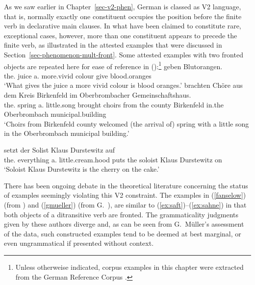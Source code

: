 As we saw earlier in Chapter~\ref{sec-v2-phen}, German is classed as V2 language, that is, normally
exactly one constituent occupies the position before the finite verb in declarative main clauses. In
what have been claimed to constitute rare, exceptional cases, however, more than one constituent
appears to precede the finite verb, as illustrated in the attested examples that were discussed in
Section~\ref{sec-phenomenon-mult-front}. Some attested examples with two fronted objects are
repeated here for ease of reference in ():\footnote{Unless otherweise indicated, corpus examples in this
  chapter were extracted from the German Reference Corpus \citep{DeReKo}.} 
\eal
\ex\label{ex:saft}
     geben Blutorangen.\footnotemark\\
         \hspaceThis{[}the.\dat{} juice \hspaceThis{[}a.\acc{} more.vivid colour give blood.oranges\\
    \glt `What gives the juice a more vivid colour is blood oranges.'
\ex
{} brachten Chöre aus dem Kreis Birkenfeld im Oberbrombacher Gemeinschaftshaus.\footnotemark\\
\hspaceThis{[}the.\dat{} spring \hspaceThis{[}a.\acc{} little.song brought choirs from the county Birkenfeld
    in.the Oberbrombach municipal.building\\
\glt `Choirs from Birkenfeld county welcomed (the arrival of) spring with a little song in the Oberbrombach municipal building.'\label{fruehling-zwei}

\ex
{} setzt der Solist Klaus Durstewitz auf\footnotemark\\
     \hspaceThis{[}the.\dat{} everything \hspaceThis{[}a.\acc{} little.cream.hood puts the soloist Klaus
         Durstewitz on\\
\glt `Soloist Klaus Durstewitz is the cherry on the cake.'\label{ex:sahne}
\zl

There has been ongoing debate in the theoretical literature concerning the status of examples seemingly violating this V2 constraint. The examples in (\ref{fanselow}) (from \citealp{Fanselow93a}) and (\ref{gmueller}) (from G.\ \citealp{GMueller2004a}), are similar to (\ref{ex:saft})--(\ref{ex:sahne}) in that both objects of a ditransitive verb are fronted. The grammaticality judgments given by these authors diverge and, as can be seen from G.\ Müller's assessment of the data, such constructed examples tend to be deemed at best marginal, or even ungrammatical if presented without context.

